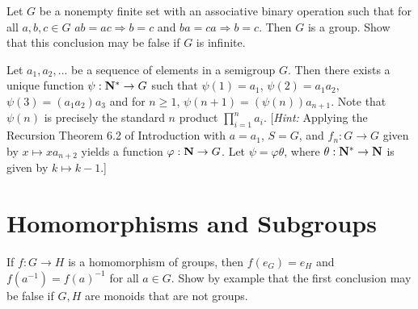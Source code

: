     \begin{exercise}
        Let $G$ be a nonempty finite set with an associative binary operation such that for all $a,b,c \in G$ $ab = ac \Rightarrow b = c$ and $ba = ca \Rightarrow b=c$. Then $G$ is a group. Show that this conclusion may be false if $G$ is infinite.
    \end{exercise}
    
    \begin{exercise}
        Let $a_1,a_2,...$ be a sequence of elements in a semigroup $G$. Then there exists a unique function $\psi:\mathbf{N}^\ast \rightarrow G$ such that $\psi(1) = a_1$, $\psi(2) = a_1 a_2$, $\psi(3) = (a_1 a_2)a_3$ and for $n \geq 1$, $\psi(n+1) = (\psi(n))a_{n+1}$. Note that $\psi(n)$ is precisely the standard $n$ product $\prod_{i = 1}^n a_i$. [\textit{Hint:} Applying the Recursion Theorem 6.2 of Introduction with $a = a_1$, $S = G$, and $f_n:G \rightarrow G$ given by $x \mapsto x a_{n+2}$ yields a function $\varphi:\mathbf{N} \rightarrow G$. Let $\psi = \varphi \theta$, where $\theta:\mathbf{N}^\ast \rightarrow \mathbf{N}$ is given by $k \mapsto k-1$.] 
    \end{exercise}
\section{Homomorphisms and Subgroups}
    \begin{exercise}
        If $f:G \rightarrow H$ is a homomorphism of groups, then $f(e_G) = e_H$ and $f(a^{-1}) = f(a)^{-1}$ for all $a \in G$. Show by example that the first conclusion may be false if $G,H$ are monoids that are not groups.
    \end{exercise}